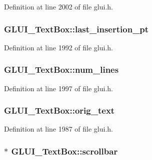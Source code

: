 Definition at line 2002 of file glui.\+h.

\hypertarget{class_g_l_u_i___text_box_ae2cf6781e36f9d0fd01ac5c8f9607679}{
\subsubsection[{last\+\_\+insertion\+\_\+pt}]{ G\+L\+U\+I\+\_\+\+Text\+Box\+::last\+\_\+insertion\+\_\+pt}}\label{class_g_l_u_i___text_box_ae2cf6781e36f9d0fd01ac5c8f9607679}


Definition at line 1992 of file glui.\+h.

\hypertarget{class_g_l_u_i___text_box_a835225eb4b76aac37d9a4433f3a5a9f2}{
\subsubsection[{num\+\_\+lines}]{ G\+L\+U\+I\+\_\+\+Text\+Box\+::num\+\_\+lines}}\label{class_g_l_u_i___text_box_a835225eb4b76aac37d9a4433f3a5a9f2}


Definition at line 1997 of file glui.\+h.

\hypertarget{class_g_l_u_i___text_box_acedd73b9f1446f4fb4609b775de4dcf9}{
\subsubsection[{orig\+\_\+text}]{ G\+L\+U\+I\+\_\+\+Text\+Box\+::orig\+\_\+text}}\label{class_g_l_u_i___text_box_acedd73b9f1446f4fb4609b775de4dcf9}


Definition at line 1987 of file glui.\+h.

\hypertarget{class_g_l_u_i___text_box_aaabf0fb6c07d0a5d1f46b258e00f5461}{
\subsubsection[{scrollbar}]{$\ast$ G\+L\+U\+I\+\_\+\+Text\+Box\+::scrollbar}}\label{class_g_l_u_i___text_box_aaabf0fb6c07d0a5d1f46b258e00f5461}


